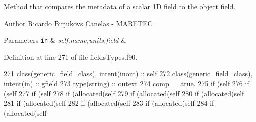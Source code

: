 Method that compares the metadata of a scalar 1D field to the object field. 

\begin{DoxyAuthor}{Author}
Ricardo Birjukovs Canelas -\/ M\+A\+R\+E\+T\+EC 
\end{DoxyAuthor}

\begin{DoxyParams}[1]{Parameters}
\mbox{\tt in}  & {\em self,name,units,field} & \\
\hline
\end{DoxyParams}


Definition at line 271 of file fields\+Types.\+f90.


\begin{DoxyCode}
271     \textcolor{keywordtype}{class}(generic\_field\_class), \textcolor{keywordtype}{intent(inout)} :: self
272     \textcolor{keywordtype}{class}(generic\_field\_class), \textcolor{keywordtype}{intent(in)} :: gfield
273     \textcolor{keywordtype}{type}(string) :: outext
274     comp = .true.
275     \textcolor{keywordflow}{if} (self%
276     \textcolor{keywordflow}{if} (self%
277     \textcolor{keywordflow}{if} (self%
278     \textcolor{keywordflow}{if} (\textcolor{keyword}{allocated}(self%
279     \textcolor{keywordflow}{if} (\textcolor{keyword}{allocated}(self%
280     \textcolor{keywordflow}{if} (\textcolor{keyword}{allocated}(self%
281     \textcolor{keywordflow}{if} (\textcolor{keyword}{allocated}(self%
282     \textcolor{keywordflow}{if} (\textcolor{keyword}{allocated}(self%
283     \textcolor{keywordflow}{if} (\textcolor{keyword}{allocated}(self%
284     \textcolor{keywordflow}{if} (\textcolor{keyword}{allocated}(self%
\end{DoxyCode}
\mbox{\label{namespacefieldtypes__mod_a67cc0dfdc7206a2769746ff7879a4375}} 
